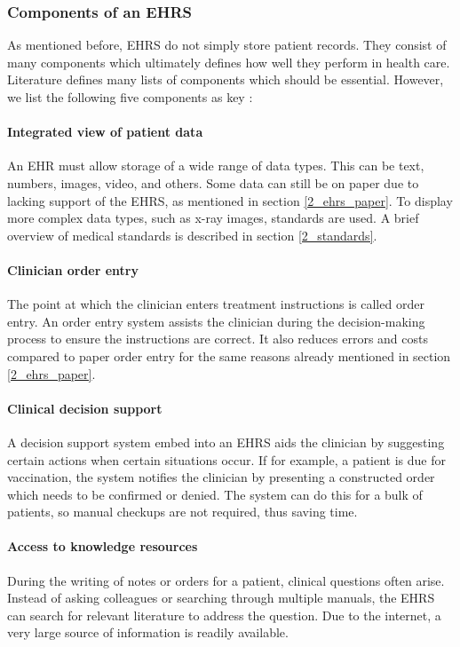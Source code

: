         \subsubsection{Components of an EHRS} \label{ehrs_components}

        As mentioned before, EHRS do not simply store patient records. They consist of many components which ultimately defines how well they perform in health care. Literature defines many lists of components which should be essential. However, we list the following five components as key \cite{biomedical_informatics}:

        \paragraph{Integrated view of patient data} An EHR must allow storage of a wide range of data types. This can be text, numbers, images, video, and others. Some data can still be on paper due to lacking support of the EHRS, as mentioned in section \ref{2_ehrs_paper}. To display more complex data types, such as x-ray images, standards are used. A brief overview of medical standards is described in section \ref{2_standards}.

        \paragraph{Clinician order entry} The point at which the clinician enters treatment instructions is called order entry. An order entry system assists the clinician during the decision-making process to ensure the instructions are correct. It also reduces errors and costs compared to paper order entry for the same reasons already mentioned in section \ref{2_ehrs_paper}.

        \paragraph{Clinical decision support} A decision support system embed into an EHRS aids the clinician by suggesting certain actions when certain situations occur. If for example, a patient is due for vaccination, the system notifies the clinician by presenting a constructed order which needs to be confirmed or denied. The system can do this for a bulk of patients, so manual checkups are not required, thus saving time.

        \paragraph{Access to knowledge resources} During the writing of notes or orders for a patient, clinical questions often arise. Instead of asking colleagues or searching through multiple manuals, the EHRS can search for relevant literature to address the question. Due to the internet, a very large source of information is readily available.

